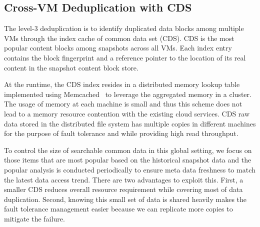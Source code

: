 \subsection{Cross-VM Deduplication with CDS}
\label{sect:crossVM}

The level-3 deduplication is to identify duplicated data blocks among multiple VMs through the index cache
of common data set (CDS).  CDS is the most popular content blocks 
among snapshots across all VMs. 
Each index entry contains  the block fingerprint and a reference pointer to the location of its real content
in the snapshot content block store.

At the runtime, the CDS index resides in a distributed  memory lookup table  
implemented using Memcached~\cite{memcached} to leverage the aggregated memory in a cluster.
The usage of memory at each machine is small and thus  this scheme  does not
lead to  a memory resource contention with the existing cloud services.
CDS raw data stored  in the distributed file system
has multiple copies in different machines for the purpose of fault tolerance and 
while providing high read throughput.  



To control the size of searchable common data in this global setting, we focus on those items that 
are most popular based on the historical snapshot data and the popular analysis is conducted periodically to ensure 
meta data freshness to match the latest data access trend.
There are two advantages to exploit this.
First, a smaller CDS reduces overall resource requirement while covering most of data duplication.
Second, knowing this small set of data is shared heavily makes the fault tolerance management 
easier because we can replicate more copies to mitigate the failure.

